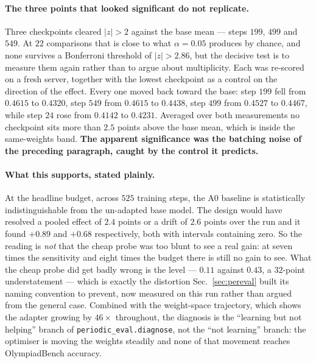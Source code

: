 \paragraph{The three points that looked significant do not replicate.} Three checkpoints
cleared $|z|>2$ against the base mean --- steps $199$, $499$ and $549$. At $22$ comparisons
that is close to what $\alpha=0.05$ produces by chance, and none survives a Bonferroni
threshold of $|z|>2.86$, but the decisive test is to measure them again rather than to argue
about multiplicity. Each was re-scored on a fresh server, together with the lowest checkpoint
as a control on the direction of the effect. Every one moved back toward the base: step $199$
fell from $0.4615$ to $0.4320$, step $549$ from $0.4615$ to $0.4438$, step $499$ from $0.4527$
to $0.4467$, while step $24$ rose from $0.4142$ to $0.4231$. Averaged over both measurements
no checkpoint sits more than $2.5$ points above the base mean, which is inside the
same-weights band. \textbf{The apparent significance was the batching noise of the preceding
paragraph, caught by the control it predicts.}

\paragraph{What this supports, stated plainly.} At the headline budget, across $525$ training
steps, the A0 baseline is statistically indistinguishable from the un-adapted base model. The
design would have resolved a pooled effect of $2.4$ points or a drift of $2.6$ points over the
run and it found $+0.89$ and $+0.68$ respectively, both with intervals containing zero. So
the reading is \emph{not} that the cheap probe was too blunt to see a real gain: at seven
times the sensitivity and eight times the budget there is still no gain to see. What the
cheap probe did get badly wrong is the level --- $0.11$ against $0.43$, a $32$-point
understatement --- which is exactly the distortion Sec.~\ref{sec:pereval} built its naming
convention to prevent, now measured on this run rather than argued from the general case.
Combined with the weight-space trajectory, which shows the adapter growing by $46\times$
throughout, the diagnosis is the ``learning but not helping'' branch of
\texttt{periodic\_eval.diagnose}, not the ``not learning'' branch: the optimiser is moving
the weights steadily and none of that movement reaches OlympiadBench accuracy.

